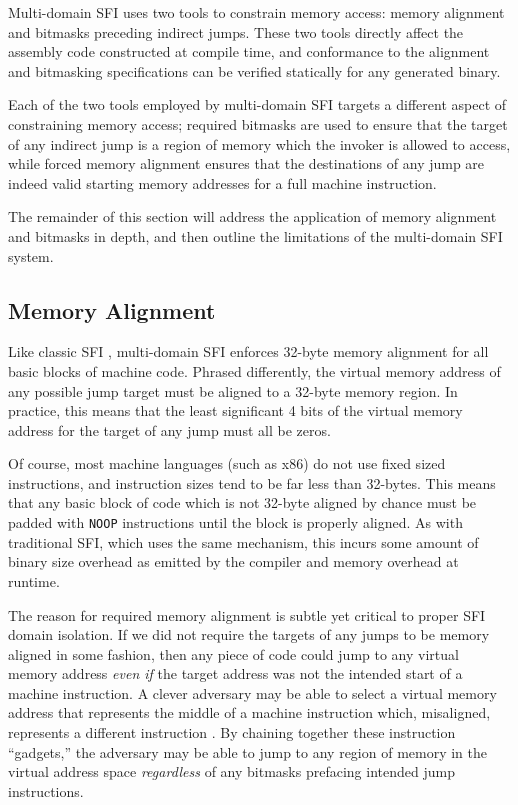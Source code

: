 \documentclass[12pt]{article}
\begin{document}
Multi-domain SFI uses two tools to constrain memory access: memory alignment and bitmasks preceding indirect jumps. These two tools directly affect the assembly code constructed at compile time, and conformance to the alignment and bitmasking specifications can be verified statically for any generated binary.

Each of the two tools employed by multi-domain SFI targets a different aspect of constraining memory access; required bitmasks are used to ensure that the target of any indirect jump is a region of memory which the invoker is allowed to access, while forced memory alignment ensures that the destinations of any jump are indeed valid starting memory addresses for a full machine instruction.

The remainder of this section will address the application of memory alignment and bitmasks in depth, and then outline the limitations of the multi-domain SFI system.

\subsection{Memory Alignment}

Like classic SFI \cite{mccamant_evaluating_2006, yee_native_2009, sehr_adapting_2010}, multi-domain SFI enforces 32-byte memory alignment for all basic blocks of machine code. Phrased differently, the virtual memory address of any possible jump target must be aligned to a 32-byte memory region. In practice, this means that the least significant 4 bits of the virtual memory address for the target of any jump must all be zeros.

Of course, most machine languages (such as x86) do not use fixed sized instructions, and instruction sizes tend to be far less than 32-bytes. This means that any basic block of code which is not 32-byte aligned by chance must be padded with \texttt{NOOP} instructions until the block is properly aligned. As with traditional SFI, which uses the same mechanism, this incurs some amount of binary size overhead as emitted by the compiler and memory overhead at runtime.

The reason for required memory alignment is subtle yet critical to proper SFI domain isolation. If we did not require the targets of any jumps to be memory aligned in some fashion, then any piece of code could jump to any virtual memory address \textit{even if} the target address was not the intended start of a machine instruction. A clever adversary may be able to select a virtual memory address that represents the middle of a machine instruction which, misaligned, represents a different instruction \cite{roemer_return-oriented_2012}. By chaining together these instruction ``gadgets,'' the adversary may be able to jump to any region of memory in the virtual address space \textit{regardless} of any bitmasks prefacing intended jump instructions.
\end{document}
